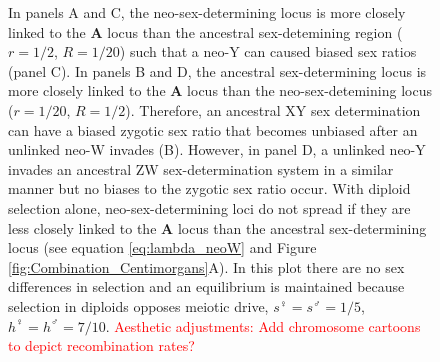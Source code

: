 \documentclass[12pt]{article}
\begin{document}
\begin{figure}[!h]
{In panels A and C, the neo-sex-determining locus is more closely linked to the \textbf{A} locus than the ancestral sex-detemining region ($r=1/2$, $R=1/20$) such that a neo-Y can caused biased sex ratios (panel C).
In panels B and D, the ancestral sex-determining locus is more closely linked to the \textbf{A} locus than the neo-sex-detemining locus ($r=1/20$, $R=1/2$). 
Therefore, an ancestral XY sex determination can have a biased zygotic sex ratio that becomes unbiased after an unlinked neo-W invades (B). 
However, in panel D, a unlinked neo-Y invades an ancestral ZW sex-determination system in a similar manner but no biases to the zygotic sex ratio occur. 
With diploid selection alone, neo-sex-determining loci do not spread if they are less closely linked to the \textbf{A} locus than the ancestral sex-determining locus (see equation \eqref{eq:lambda_neoW} and Figure \ref{fig:Combination_Centimorgans}A). 
In this plot there are no sex differences in selection and an equilibrium is maintained because selection in diploids opposes meiotic drive, $s^\female =s^\male = 1/5$, $h^\female = h^\male = 7/10$.
\textcolor{red}{Aesthetic adjustments: 
Add chromosome cartoons to depict recombination rates?
}
}
\label{fig:Combination_Turnover}
\end{figure}
\newpage
\end{document}
